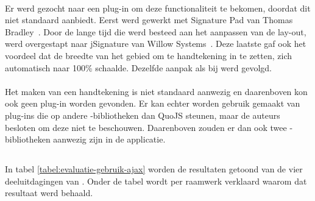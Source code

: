 \paragraph{\jqm}
Er werd gezocht naar een plug-in om deze functionaliteit te bekomen, doordat \jqm{} dit niet standaard aanbiedt. 
Eerst werd gewerkt met Signature Pad van Thomas Bradley~\cite{Bradley2013}. 
Door de lange tijd die werd besteed aan het aanpassen van de lay-out, werd overgestapt naar jSignature van Willow Systems~\cite{Systems2013}. 
Deze laatste gaf ook het voordeel dat de breedte van het gebied om te handtekening in te zetten, zich automatisch naar 100\% schaalde. 
Dezelfde aanpak als bij \kendo{} werd gevolgd.

\paragraph{\lungo}
Het maken van een handtekening is niet standaard aanwezig en daarenboven kon ook geen plug-in worden gevonden.
Er kan echter worden gebruik gemaakt van plug-ins die op andere \js{}-bibliotheken dan QuoJS steunen, maar de auteurs besloten om deze niet te beschouwen.
Daarenboven zouden er dan ook twee \js{}-bibliotheken aanwezig zijn in de applicatie.



\subsection{}
\label{sec:evaluatie-gebruik-ajax}

In tabel \ref{tabel:evaluatie-gebruik-ajax} worden de resultaten getoond van de vier deeluitdagingen van .
Onder de tabel wordt per raamwerk verklaard waarom dat resultaat werd behaald.

\begin{table}
\centering
{}
\caption{Gebruik van .}
\label{tabel:evaluatie-gebruik-ajax}
\end{table}

